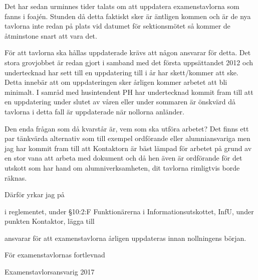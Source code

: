 \documentclass[../_main/handlingar.tex]{subfiles}
\begin{document}

Det har sedan urminnes tider talats om att uppdatera examenstavlorna som fanns i foajén. Stunden då detta faktiskt sker är äntligen kommen och är de nya tavlorna inte redan på plats vid datumet för sektionsmötet så kommer de åtminstone snart att vara det.

För att tavlorna ska hållas uppdaterade krävs att någon ansvarar för detta. Det stora grovjobbet är redan gjort i samband med det första uppsättandet 2012 och undertecknad har sett till en uppdatering till i år har skett/kommer att ske. Detta innebär att om uppdateringen sker årligen kommer arbetet att bli minimalt. I samråd med husintendent PH har undertecknad kommit fram till att en uppdatering under slutet av våren eller under sommaren är önskvärd då tavlorna i detta fall är uppdaterade när nollorna anländer.

Den enda frågan som då kvarstår är, vem som ska utföra arbetet? Det finns ett par tänkvärda alternativ som till exempel ordförande eller alumniansvariga men jag har kommit fram till att Kontaktorn är bäst lämpad för arbetet på grund av en stor vana att arbeta med dokument och då hen även är ordförande för det utskott som har hand om alumniverksamheten, dit tavlorna rimligtvis borde räknas.

Därför yrkar jag på
\begin{attsatser}
    \att i reglementet, under \S10:2:F Funktionärerna i Informationsutskottet, InfU, under punkten Kontaktor, lägga till
    \begin{itshape}
        \begin{itemizedash}
            \item ansvarar för att examenstavlorna årligen uppdateras innan nollningens början.
        \end{itemizedash}
    \end{itshape}

   \end{attsatser}

\begin{signatures}{1}
    För examenstavlornas fortlevnad
    \signature{Fredrik Peterson}{Examenstavlorsansvarig 2017}
\end{signatures}
\end{document}
